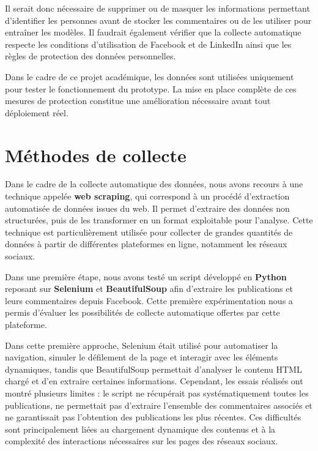 \documentclass[12pt,a4paper,oneside]{report}
\begin{document}
Il serait donc nécessaire de supprimer ou de masquer les informations permettant d'identifier les personnes avant de stocker les commentaires ou de les utiliser pour entraîner les modèles. Il faudrait également vérifier que la collecte automatique respecte les conditions d'utilisation de Facebook et de LinkedIn ainsi que les règles de protection des données personnelles.

Dans le cadre de ce projet académique, les données sont utilisées uniquement pour tester le fonctionnement du prototype. La mise en place complète de ces mesures de protection constitue une amélioration nécessaire avant tout déploiement réel.

\section{Méthodes de collecte}
Dans le cadre de la collecte automatique des données, nous avons recours à une technique appelée \textbf{web scraping}, qui correspond à un procédé d’extraction automatisée de données issues du web. Il permet d’extraire des données non structurées, puis de les transformer en un format exploitable pour l’analyse. Cette technique est particulièrement utilisée pour collecter de grandes quantités de données à partir de différentes plateformes en ligne, notamment les réseaux sociaux.

\vspace{0.3cm}

Dans une première étape, nous avons testé un script développé en \textbf{Python} reposant sur \textbf{Selenium} et \textbf{BeautifulSoup} afin d’extraire les publications et leurs commentaires depuis Facebook. Cette première expérimentation nous a permis d’évaluer les possibilités de collecte automatique offertes par cette plateforme.

Dans cette première approche, Selenium était utilisé pour automatiser la navigation, simuler le défilement de la page et interagir avec les éléments dynamiques, tandis que BeautifulSoup permettait d’analyser le contenu HTML chargé et d’en extraire certaines informations. Cependant, les essais réalisés ont montré plusieurs limites : le script ne récupérait pas systématiquement toutes les publications, ne permettait pas d’extraire l’ensemble des commentaires associés et ne garantissait pas l’obtention des publications les plus récentes. Ces difficultés sont principalement liées au chargement dynamique des contenus et à la complexité des interactions nécessaires sur les pages des réseaux sociaux.
\end{document}
